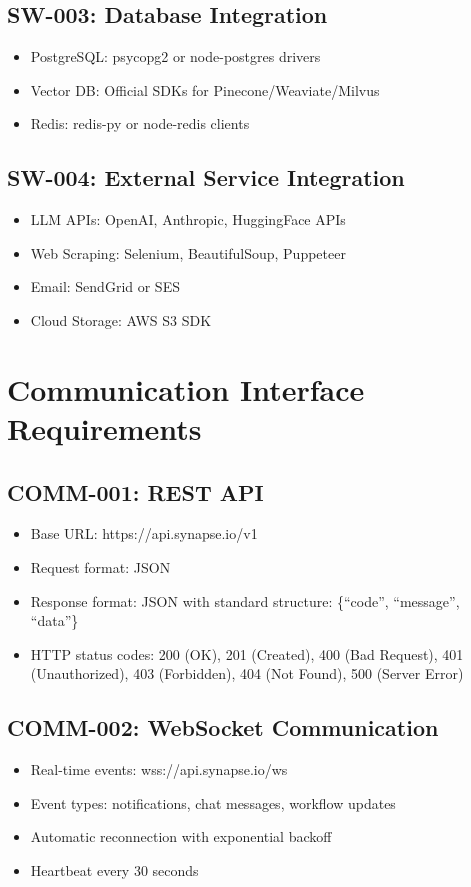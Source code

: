 \documentclass{report}
\begin{document}
\subsection{SW-003: Database Integration}
\begin{itemize}
    \item PostgreSQL: psycopg2 or node-postgres drivers
    \item Vector DB: Official SDKs for Pinecone/Weaviate/Milvus
    \item Redis: redis-py or node-redis clients
\end{itemize}

\subsection{SW-004: External Service Integration}
\begin{itemize}
    \item LLM APIs: OpenAI, Anthropic, HuggingFace APIs
    \item Web Scraping: Selenium, BeautifulSoup, Puppeteer
    \item Email: SendGrid or SES
    \item Cloud Storage: AWS S3 SDK
\end{itemize}

\section{Communication Interface Requirements}

\subsection{COMM-001: REST API}
\begin{itemize}
    \item Base URL: https://api.synapse.io/v1
    \item Request format: JSON
    \item Response format: JSON with standard structure: \{``code'', ``message'', ``data''\}
    \item HTTP status codes: 200 (OK), 201 (Created), 400 (Bad Request), 401 (Unauthorized), 403 (Forbidden), 404 (Not Found), 500 (Server Error)
\end{itemize}

\subsection{COMM-002: WebSocket Communication}
\begin{itemize}
    \item Real-time events: wss://api.synapse.io/ws
    \item Event types: notifications, chat messages, workflow updates
    \item Automatic reconnection with exponential backoff
    \item Heartbeat every 30 seconds
\end{itemize}
\end{document}
